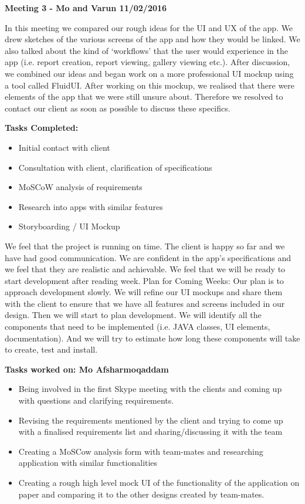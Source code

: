 \documentclass[12pt]{article}
\begin{document}
\par
\bigskip
	\textbf{Meeting 3 - Mo and Varun 11/02/2016} 
\par
In this meeting we compared our rough ideas for the UI and UX of the app. We drew sketches of the various screens of the app and how they would be linked. We also talked about the kind of ‘workflows’ that the user would experience in the app (i.e. report creation, report viewing, gallery viewing etc.). After discussion, we combined our ideas and began work on a more professional UI mockup using a tool called FluidUI.
After working on this mockup, we realised that there were elements of the app that we were still unsure about. Therefore we resolved to contact our client as soon as possible to discuss these specifics. 
\par
\bigskip

\textbf{Tasks Completed:}
\begin{itemize} 
\item Initial contact with client
\item Consultation with client, clarification of specifications
\item MoSCoW analysis of requirements
\item Research into apps with similar features
\item Storyboarding / UI Mockup
\end{itemize}

\bigskip
We feel that the project is running on time. The client is happy so far and we have had good communication. We are confident in the app’s specifications and we feel that they are realistic and achievable. We feel that we will be ready to start development after reading week.
Plan for Coming Weeks:
	Our plan is to approach development slowly. We will refine our UI mockups and share them with the client to ensure that we have all features and screens included in our design.
	Then we will start to plan development. We will identify all the components that need to be implemented (i.e. JAVA classes, UI elements, documentation). And we will try to estimate how long these components will take to create, test and install.

\bigskip
	
\textbf{Tasks worked on: Mo Afsharmoqaddam}
\begin{itemize}
\item Being involved in the first Skype meeting with the clients and coming up with questions and clarifying requirements. 
\item Revising the requirements mentioned by the client and trying to come up with a finalised requirements list and sharing/discussing it with the team
\item Creating a MoSCow analysis form with team-mates and researching application with similar functionalities
\item Creating a rough high level mock UI of the functionality of the application on paper and comparing it to the other designs created by team-mates. 
\end{itemize}
\end{document}
